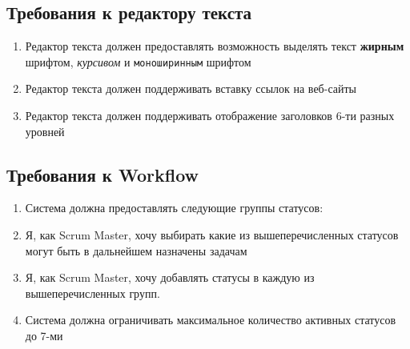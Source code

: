 \documentclass[14pt,a4paper]{extarticle}
\begin{document}
\subsection{Требования к редактору текста}
\begin{enumerate}[label=\textbf{AER\arabic*}.]
	\item Редактор текста должен предоставлять возможность выделять текст
	      \textbf{жирным} шрифтом, \textit{курсивом} и \texttt{моноширинным} шрифтом
	\item Редактор текста должен поддерживать вставку ссылок на веб-сайты
	\item Редактор текста должен поддерживать отображение заголовков 6-ти разных
	      уровней
\end{enumerate}

\subsection{Требования к Workflow}
\begin{enumerate}[label=\textbf{WFR\arabic*}.]
	\item Система должна предоставлять следующие группы статусов:
	\item Я, как Scrum Master, хочу выбирать какие из вышеперечисленных статусов могут быть в дальнейшем назначены задачам
	\item Я, как Scrum Master, хочу добавлять статусы в каждую из вышеперечисленных групп.
	\item Система должна ограничивать максимальное количество активных статусов до 7-ми
\end{enumerate}
\end{document}
